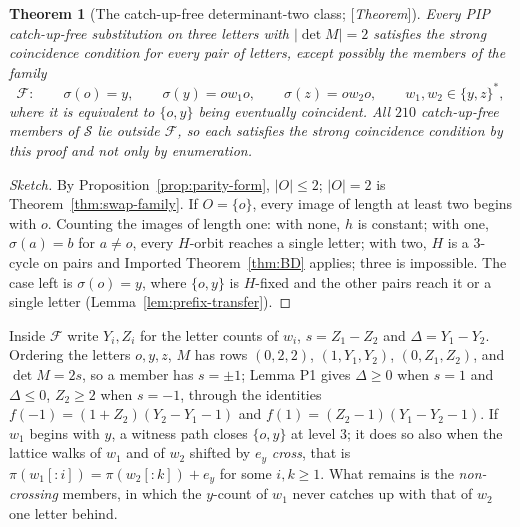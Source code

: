 \documentclass[11pt]{amsart}
\theoremstyle{plain}
\newtheorem{theorem}{Theorem}[section]
\theoremstyle{definition}
\theoremstyle{remark}
\newcommand{\Status}[1]{\textup{[\textit{#1}]}}
\begin{document}
\begin{theorem}[The catch-up-free determinant-two class; \Status{Theorem}]\label{thm:K}
Every PIP catch-up-free substitution on three letters with $|\det M|=2$ satisfies the strong coincidence condition for every pair of letters, except possibly the members of the family
\[
\mathcal F:\qquad\sigma(o)=y,\qquad\sigma(y)=ow_1o,\qquad\sigma(z)=ow_2o,\qquad w_1,w_2\in\{y,z\}^*,
\]
where it is equivalent to $\{o,y\}$ being eventually coincident. All $210$ catch-up-free members of $\mathcal S$ lie outside $\mathcal F$, so each satisfies the strong coincidence condition by this proof and not only by enumeration.
\end{theorem}
\begin{proof}[Sketch]
By Proposition~\ref{prop:parity-form}, $|O|\le2$; $|O|=2$ is Theorem~\ref{thm:swap-family}. If $O=\{o\}$, every image of length at least two begins with $o$. Counting the images of length one: with none, $h$ is constant; with one, $\sigma(a)=b$ for $a\ne o$, every $H$-orbit reaches a single letter; with two, $H$ is a $3$-cycle on pairs and Imported Theorem~\ref{thm:BD} applies; three is impossible. The case left is $\sigma(o)=y$, where $\{o,y\}$ is $H$-fixed and the other pairs reach it or a single letter (Lemma~\ref{lem:prefix-transfer}).
\end{proof}

Inside $\mathcal F$ write $Y_i,Z_i$ for the letter counts of $w_i$, $s=Z_1-Z_2$ and $\Delta=Y_1-Y_2$. Ordering the letters $o,y,z$, $M$ has rows $(0,2,2)$, $(1,Y_1,Y_2)$, $(0,Z_1,Z_2)$, and $\det M=2s$, so a member has $s=\pm1$; Lemma P1 gives $\Delta\ge0$ when $s=1$ and $\Delta\le0$, $Z_2\ge2$ when $s=-1$, through the identities $f(-1)=(1+Z_2)(Y_2-Y_1-1)$ and $f(1)=(Z_2-1)(Y_1-Y_2-1)$. If $w_1$ begins with $y$, a witness path closes $\{o,y\}$ at level $3$; it does so also when the lattice walks of $w_1$ and of $w_2$ shifted by $e_y$ \emph{cross}, that is $\pi(w_1[{:}i])=\pi(w_2[{:}k])+e_y$ for some $i,k\ge1$. What remains is the \emph{non-crossing} members, in which the $y$-count of $w_1$ never catches up with that of $w_2$ one letter behind.
\end{document}
